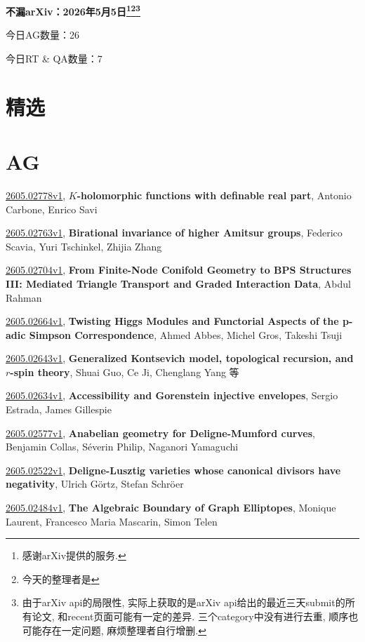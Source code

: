 \documentclass[9pt, a4paper]{article}
\theoremstyle{plain}
\theoremstyle{definition}
\theoremstyle{remark}
\newcommand{\arxiv}[3]{\href{https://arxiv.org/abs/#1}{#1}, \textbf{\textcolor{arxivblue}{#2}}, #3}
\newcommand{\AGnumber}{26}
\newcommand{\RTQAnumber}{7}
\newcommand{\NewestDate}{2026年5月5日}
\newcommand{\todayarXiver}{} %
\begin{document}
\begin{center}
    \Huge\textbf{不漏arXiv：\NewestDate\footnote{感谢arXiv提供的服务.}\footnote{今天的整理者是\todayarXiver}\footnote{由于arXiv api的局限性, 实际上获取的是arXiv api给出的最近三天submit的所有论文, 和recent页面可能有一定的差异. 三个category中没有进行去重, 顺序也可能存在一定问题, 麻烦整理者自行增删.}} \\
\end{center}

\setcounter{section}{-1}

\begin{center}
    今日AG数量：\AGnumber
    
    今日RT \& QA数量：\RTQAnumber
    
\end{center}


\section{精选}


\section{AG}
\arxiv{2605.02778v1}{$K$-holomorphic functions with definable real part}{Antonio Carbone, Enrico Savi}

\arxiv{2605.02763v1}{Birational invariance of higher Amitsur groups}{Federico Scavia, Yuri Tschinkel, Zhijia Zhang}

\arxiv{2605.02704v1}{From Finite-Node Conifold Geometry to BPS Structures III: Mediated Triangle Transport and Graded Interaction Data}{Abdul Rahman}

\arxiv{2605.02664v1}{Twisting Higgs Modules and Functorial Aspects of the p-adic Simpson Correspondence}{Ahmed Abbes, Michel Gros, Takeshi Tsuji}

\arxiv{2605.02643v1}{Generalized Kontsevich model, topological recursion, and $r$-spin theory}{Shuai Guo, Ce Ji, Chenglang Yang 等}

\arxiv{2605.02634v1}{Accessibility and Gorenstein injective envelopes}{Sergio Estrada, James Gillespie}

\arxiv{2605.02577v1}{Anabelian geometry for Deligne-Mumford curves}{Benjamin Collas, Séverin Philip, Naganori Yamaguchi}

\arxiv{2605.02522v1}{Deligne-Lusztig varieties whose canonical divisors have negativity}{Ulrich Görtz, Stefan Schröer}

\arxiv{2605.02484v1}{The Algebraic Boundary of Graph Elliptopes}{Monique Laurent, Francesco Maria Mascarin, Simon Telen}
\end{document}
